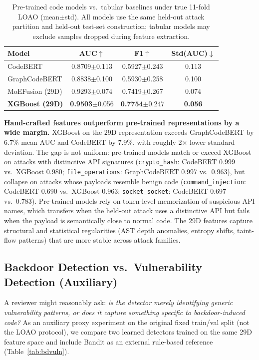﻿\documentclass[sigconf,review,anonymous]{acmart}
\newcommand{\sys}{MoEFusion}
\begin{document}
\begin{table}[t]
\centering
\caption{Pre-trained code models vs.\ tabular baselines under true 11-fold
LOAO (mean$\pm$std). All models use the same held-out attack partition and
held-out test-set construction; tabular models may exclude samples dropped
during feature extraction.}
\label{tab:pretrained}
\small
\begin{tabular}{lccc}
\toprule
Model & AUC$\uparrow$ & F1$\uparrow$ & Std(AUC)$\downarrow$ \\
\midrule
CodeBERT & 0.8709$\pm$0.113 & 0.5927$\pm$0.243 & 0.113 \\
GraphCodeBERT & 0.8838$\pm$0.100 & 0.5930$\pm$0.258 & 0.100 \\
\midrule
\sys{} (29D) & 0.9293$\pm$0.074 & 0.7419$\pm$0.267 & 0.074 \\
\textbf{XGBoost (29D)} & \textbf{0.9503}$\pm$0.056 & \textbf{0.7754}$\pm$0.247 & \textbf{0.056} \\
\bottomrule
\end{tabular}
\end{table}

\textbf{Hand-crafted features outperform pre-trained representations by a wide
margin.}
XGBoost on the 29D representation exceeds GraphCodeBERT by 6.7\% mean AUC and
CodeBERT by 7.9\%, with roughly 2$\times$ lower standard deviation.
The gap is not uniform: pre-trained models match or exceed XGBoost on attacks
with distinctive API signatures (\texttt{crypto\_hash}: CodeBERT 0.999 vs.\
XGBoost 0.980; \texttt{file\_operations}: GraphCodeBERT 0.997 vs.\ 0.963),
but collapse on attacks whose payloads resemble benign code
(\texttt{command\_injection}: CodeBERT 0.690 vs.\ XGBoost 0.963;
\texttt{socket\_socket}: CodeBERT 0.697 vs.\ 0.783).
Pre-trained models rely on token-level memorization of suspicious API names,
which transfers when the held-out attack uses a distinctive API but fails when
the payload is semantically close to normal code.
The 29D features capture structural and statistical regularities (AST depth
anomalies, entropy shifts, taint-flow patterns) that are more stable across
attack families.

\subsection{Backdoor Detection vs.\ Vulnerability Detection (Auxiliary)}
\label{sec:exp:bdvuln}

A reviewer might reasonably ask: \emph{is the detector merely identifying
generic vulnerability patterns, or does it capture something specific to
backdoor-induced code?}
As an auxiliary proxy experiment on the original fixed train/val split
(not the LOAO protocol), we compare two learned detectors trained on the same
29D feature space and include Bandit as an external rule-based reference
(Table~\ref{tab:bdvuln}).
\end{document}
